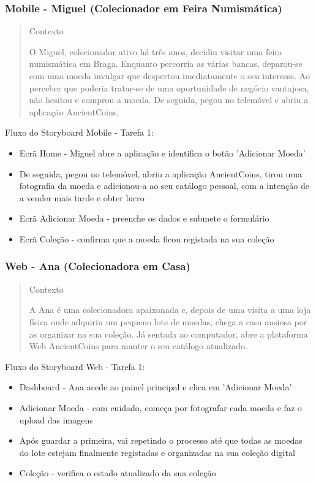 \documentclass[12pt,a4paper]{article}
\begin{document}
\subsubsection{Mobile - Miguel (Colecionador em Feira Numismática)}

\begin{quote}
\small
Contexto\par
O Miguel, colecionador ativo há três anos, decidiu visitar uma feira numismática em Braga. Enquanto percorria as várias bancas, deparou-se com uma moeda invulgar que despertou imediatamente o seu interesse. Ao perceber que poderia tratar-se de uma oportunidade de negócio vantajosa, não hesitou e comprou a moeda. De seguida, pegou no telemóvel e abriu a aplicação AncientCoins.
\end{quote}

Fluxo do Storyboard Mobile - Tarefa 1:

\begin{itemize}
\setlength{\itemsep}{0.15em}
\item Ecrã Home - Miguel abre a aplicação e identifica o botão 'Adicionar Moeda'
\item De seguida, pegou no telemóvel, abriu a aplicação AncientCoins, tirou uma fotografia da moeda e adicionou-a ao seu catálogo pessoal, com a intenção de a vender mais tarde e obter lucro
\item Ecrã Adicionar Moeda - preenche os dados e submete o formulário
\item Ecrã Coleção - confirma que a moeda ficou registada na sua coleção
\end{itemize}

\subsubsection{Web - Ana (Colecionadora em Casa)}

\begin{quote}
\small
Contexto\par
A Ana é uma colecionadora apaixonada e, depois de uma visita a uma loja física onde adquiriu um pequeno lote de moedas, chega a casa ansiosa por as organizar na sua coleção. Já sentada ao computador, abre a plataforma Web AncientCoins para manter o seu catálogo atualizado.
\end{quote}

Fluxo do Storyboard Web - Tarefa 1:

\begin{itemize}
\setlength{\itemsep}{0.15em}
\item Dashboard - Ana acede ao painel principal e clica em 'Adicionar Moeda'
\item Adicionar Moeda - com cuidado, começa por fotografar cada moeda e faz o upload das imagens
\item Após guardar a primeira, vai repetindo o processo até que todas as moedas do lote estejam finalmente registadas e organizadas na sua coleção digital
\item Coleção - verifica o estado atualizado da sua coleção
\end{itemize}
\end{document}
